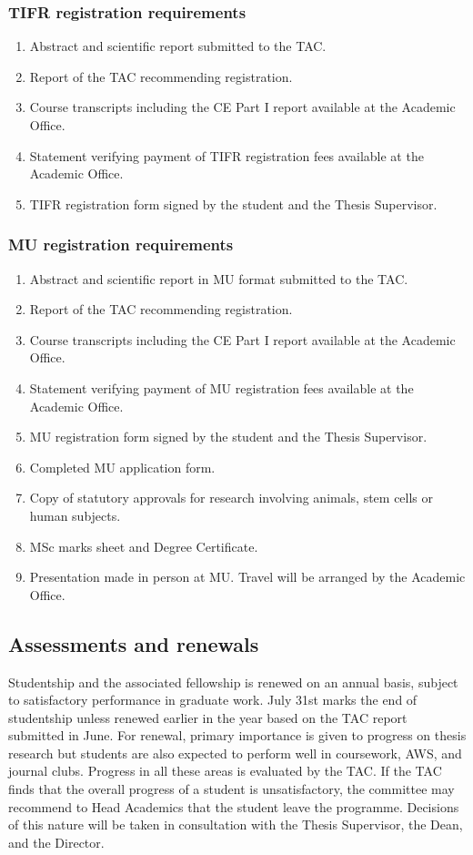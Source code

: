 \documentclass[a4paper]{extarticle}
\begin{document}
\subsubsection{TIFR registration requirements}
\begin{enumerate}
    \item  Abstract and scientific report submitted to the TAC.
    \item  Report of the TAC recommending registration.
    \item  Course transcripts including the CE Part I report available at the Academic Office.
    \item  Statement verifying payment of TIFR registration fees available at the Academic Office.
    \item  TIFR registration form signed by the student and the Thesis Supervisor.
\end{enumerate}

\subsubsection{MU registration requirements}
\begin{enumerate}
    \item  Abstract and scientific report in MU format submitted to the TAC.
    \item  Report of the TAC recommending registration.
    \item  Course transcripts including the CE Part I report available at the Academic Office.
    \item  Statement verifying payment of MU registration fees available at the Academic Office.
    \item  MU registration form signed by the student and the Thesis Supervisor.
    \item  Completed MU application form.
    \item  Copy of statutory approvals for research involving animals, stem cells or human subjects.
    \item  MSc marks sheet and Degree Certificate.
    \item  Presentation made in person at MU. Travel will be arranged by the Academic Office.
\end{enumerate}

	
\subsection{Assessments and renewals}
Studentship and the associated fellowship is renewed on an
annual basis, subject to satisfactory performance in graduate work. July 31st marks the end
of studentship unless renewed earlier in the year based on the TAC report submitted in June.
For renewal, primary importance is given to progress on thesis research but students are also
expected to perform well in coursework, AWS, and journal clubs. Progress in all these areas
is evaluated by the TAC. If the TAC finds that the overall progress of a student is
unsatisfactory, the committee may recommend to Head Academics that the student leave the
programme. Decisions of this nature will be taken in consultation with the Thesis
Supervisor, the Dean, and the Director.
\end{document}
